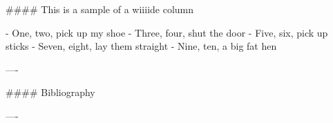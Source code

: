 \documentclass{beamer}
\begin{document}
\begin{frame}[fragile]
\begin{markdown}

#### This is a sample of a wiiiide column

- One, two, pick up my shoe
- Three, four, shut the door
- Five, six, pick up sticks
- Seven, eight, lay them straight
- Nine, ten, a big fat hen

----


#### Bibliography




----

\end{markdown}

\end{frame}
\end{document}
